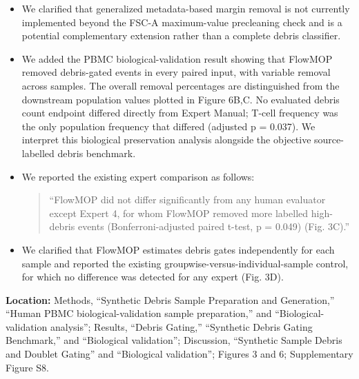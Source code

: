 \documentclass[
  11pt,
  a4paper,
]{article}
\begin{document}
\begin{itemize}
  \begin{quote}
  ``SSC-A may improve recognition of larger or internally complex
  debris, while pulse-width measurements may assist with aggregates.
  Accordingly, FlowMOP does not currently incorporate these features
  because broadly applicable decision rules are difficult to establish
  across tissues, panels, instruments, and acquisition settings.''
  \end{quote}
\item
  We clarified that generalized metadata-based margin removal is not
  currently implemented beyond the FSC-A maximum-value precleaning check
  and is a potential complementary extension rather than a complete
  debris classifier.
\item
  We added the PBMC biological-validation result showing that FlowMOP
  removed debris-gated events in every paired input, with variable
  removal across samples. The overall removal percentages are
  distinguished from the downstream population values plotted in Figure
  6B,C. No evaluated debris count endpoint differed directly from Expert
  Manual; T-cell frequency was the only population frequency that
  differed (adjusted p = 0.037). We interpret this biological
  preservation analysis alongside the objective source-labelled debris
  benchmark.
\item
  We reported the existing expert comparison as follows:

  \begin{quote}
  ``FlowMOP did not differ significantly from any human evaluator except
  Expert 4, for whom FlowMOP removed more labelled high-debris events
  (Bonferroni-adjusted paired t-test, p = 0.049) (Fig. 3C).''
  \end{quote}
\item
  We clarified that FlowMOP estimates debris gates independently for
  each sample and reported the existing
  groupwise-versus-individual-sample control, for which no difference
  was detected for any expert (Fig. 3D).
\end{itemize}

\textbf{Location:} Methods, ``Synthetic Debris Sample Preparation and
Generation,'' ``Human PBMC biological-validation sample preparation,''
and ``Biological-validation analysis''; Results, ``Debris Gating,''
``Synthetic Debris Gating Benchmark,'' and ``Biological validation'';
Discussion, ``Synthetic Sample Debris and Doublet Gating'' and
``Biological validation''; Figures 3 and 6; Supplementary Figure S8.
\end{document}
